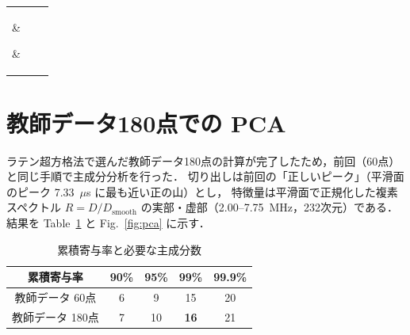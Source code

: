 \documentclass{jarticle}
\begin{document}
%
\begin{center}
 \begin{tabular}{|c|c|c|} \hline
  \parbox{50mm}{\vspace{1mm} } &
  \parbox{55mm}{\vspace{1mm} } &
  \parbox{50mm}{\vspace{1mm} }
  \\ [2mm] \hline
%
  \\ [2mm] \hline\hline
%
  \\ [2mm] \hline
 \end{tabular}
\end{center}
\par



\section{教師データ180点での PCA}
ラテン超方格法で選んだ教師データ180点の計算が完了したため，前回（60点）と同じ手順で主成分分析を行った．
切り出しは前回の「正しいピーク」（平滑面のピーク 7.33~$\mu$s に最も近い正の山）とし，
特徴量は平滑面で正規化した複素スペクトル $R = D / D_{\mathrm{smooth}}$ の実部・虚部（2.00--7.75~MHz，232次元）である．
結果を Table~\ref{tab:pca} と Fig.~\ref{fig:pca} に示す．

\begin{table}[htbp]
 \centering
 \caption{累積寄与率と必要な主成分数}
 \label{tab:pca}
 \begin{tabular}{c|cccc} \hline
  累積寄与率 & 90\% & 95\% & 99\% & 99.9\% \\ \hline
  教師データ 60点  & 6 & 9  & 15          & 20 \\
  教師データ 180点 & 7 & 10 & \textbf{16} & 21 \\ \hline
 \end{tabular}
\end{table}
\end{document}
